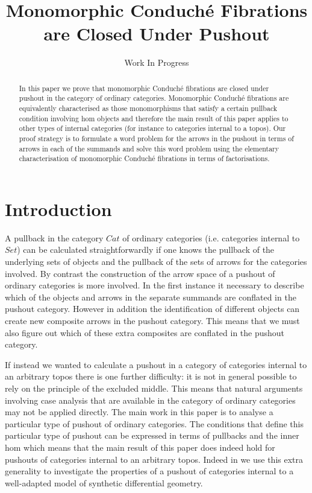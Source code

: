 \documentclass{article}
\title{Monomorphic Conduch\'{e} Fibrations are Closed Under Pushout}
\author{Work In Progress}
\begin{document}
\maketitle
\begin{abstract}
	In this paper we prove that monomorphic Conduch\'{e} fibrations are closed under pushout in the category of ordinary categories.
	Monomorphic Conduch\'{e} fibrations are equivalently characterised as those monomorphisms that satisfy a certain pullback condition involving hom objects and therefore the main result of this paper applies to other types of internal categories (for instance to categories internal to a topos).
	Our proof strategy is to formulate a word problem for the arrows in the pushout in terms of arrows in each of the summands and solve this word problem using the elementary characterisation of monomorphic Conduch\'{e} fibrations in terms of factorisations.
\end{abstract}
\tableofcontents

\section{Introduction}

A pullback in the category $Cat$ of ordinary categories (i.e. categories internal to $Set$) can be calculated straightforwardly if one knows the pullback of the underlying sets of objects and the pullback of the sets of arrows for the categories involved.
By contrast the construction of the arrow space of a pushout of ordinary categories is more involved.
In the first instance it necessary to describe which of the objects and arrows in the separate summands are conflated in the pushout category.
However in addition the identification of different objects can create new composite arrows in the pushout category.
This means that we must also figure out which of these extra composites are conflated in the pushout category.

If instead we wanted to calculate a pushout in a category of categories internal to an arbitrary topos there is one further difficulty: it is not in general possible to rely on the principle of the excluded middle.
This means that natural arguments involving case analysis that are available in the category of ordinary categories may not be applied directly.
The main work in this paper is to analyse a particular type of pushout of ordinary categories.
The conditions that define this particular type of pushout can be expressed in terms of pullbacks and the inner hom which means that the main result of this paper does indeed hold for pushouts of categories internal to an arbitrary topos.
Indeed in \cite{intuitionistic-double-negation} we use this extra generality to investigate the properties of a pushout of categories internal to a well-adapted model of synthetic differential geometry.
\end{document}
